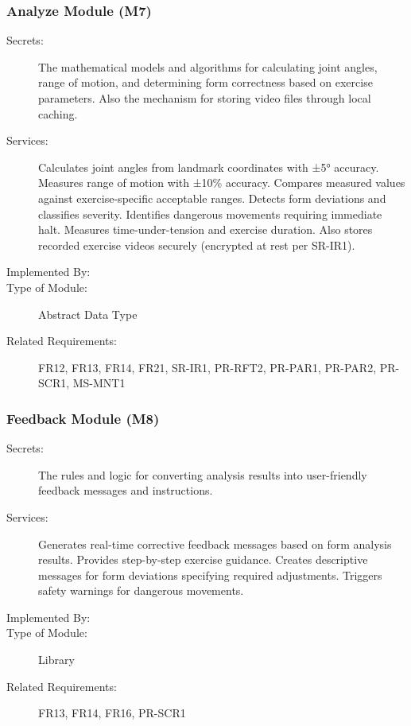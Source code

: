 \documentclass[12pt, titlepage]{article}
\begin{document}
\subsubsection{Analyze Module (M7)}
\begin{description}
	\item[Secrets:] The mathematical models and algorithms for calculating joint angles, range of motion, and determining form correctness based on exercise parameters. Also the mechanism for storing video files through local caching.
	\item[Services:] Calculates joint angles from landmark coordinates with ±5° accuracy. Measures range of motion with ±10\% accuracy. Compares measured values against exercise-specific acceptable ranges. Detects form deviations and classifies severity. Identifies dangerous movements requiring immediate halt. Measures time-under-tension and exercise duration. Also stores recorded exercise videos securely (encrypted at rest per SR-IR1).
	\item[Implemented By:] \progname{}
	\item[Type of Module:] Abstract Data Type
	\item[Related Requirements:] FR12, FR13, FR14, FR21, SR-IR1, PR-RFT2, PR-PAR1, PR-PAR2, PR-SCR1, MS-MNT1
\end{description}

\subsubsection{Feedback Module (M8)}
\begin{description}
	\item[Secrets:] The rules and logic for converting analysis results into user-friendly feedback messages and instructions.
	\item[Services:] Generates real-time corrective feedback messages based on form analysis results. Provides step-by-step exercise guidance. Creates descriptive messages for form deviations specifying required adjustments. Triggers safety warnings for dangerous movements.
	\item[Implemented By:] \progname{}
	\item[Type of Module:] Library
	\item[Related Requirements:] FR13, FR14, FR16, PR-SCR1
\end{description}
\end{document}
